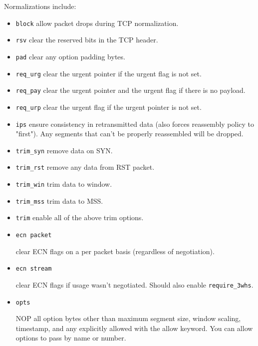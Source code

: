 \documentclass[english]{report}
\begin{document}
Normalizations include:

\begin{itemize} 
\item \texttt{block}
allow packet drops during TCP normalization.

\item \texttt{rsv}
clear the reserved bits in the TCP header.

\item \texttt{pad}
clear any option padding bytes.

\item \texttt{req\_urg}
clear the urgent pointer if the urgent flag is not set.

\item \texttt{req\_pay}
clear the urgent pointer and the urgent flag if there is no payload.

\item \texttt{req\_urp} 
clear the urgent flag if the urgent pointer is not set.

\item \texttt{ips} 
ensure consistency in retransmitted data (also forces reassembly policy to
"first").  Any segments that can't be properly reassembled will be dropped.

\item \texttt{trim\_syn} 
remove data on SYN.

\item \texttt{trim\_rst} 
remove any data from RST packet.

\item \texttt{trim\_win} 
trim data to window.

\item \texttt{trim\_mss} 
trim data to MSS.

\item \texttt{trim} 
enable all of the above trim options.

\item \texttt{ecn packet} 

clear ECN flags on a per packet basis (regardless of negotiation).

\item \texttt{ecn stream} 

clear ECN flags if usage wasn't negotiated.  Should also enable \texttt{require\_3whs}.

\item \texttt{opts} 

NOP all option bytes other than maximum segment size, window scaling,
timestamp, and any explicitly allowed with the allow keyword.  You can allow
options to pass by name or number.


\end{itemize}
\end{document}
